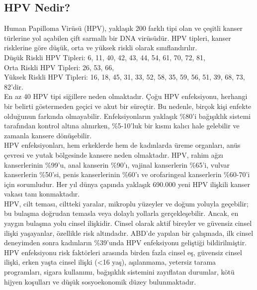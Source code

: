 \documentclass[turkish]{article}
\begin{document}
\subsection{HPV Nedir?}
Human Papilloma Virüsü (HPV), yaklaşık 200 farklı tipi olan ve çeşitli kanser türlerine yol açabilen çift sarmallı bir DNA virüsüdür. HPV tipleri, kanser risklerine göre düşük, orta ve yüksek riskli olarak sınıflandırılır.
\\Düşük Riskli HPV Tipleri: 6, 11, 40, 42, 43, 44, 54, 61, 70, 72, 81,
\\Orta Riskli HPV Tipleri: 26, 53, 66,
\\Yüksek Riskli HPV Tipleri: 16, 18, 45, 31, 33, 52, 58, 35, 59, 56, 51, 39, 68, 73, 82’dir.
\\En az 40 HPV tipi siğillere neden olmaktadır. Çoğu HPV enfeksiyonu, herhangi bir belirti göstermeden geçici ve akut bir süreçtir. Bu nedenle, birçok kişi enfekte olduğunun farkında olmayabilir. Enfeksiyonların yaklaşık \%80’i bağışıklık sistemi tarafından kontrol altına alınırken, \%5-10’luk bir kısmı kalıcı hale gelebilir ve zamanla kansere dönüşebilir.
\\HPV enfeksiyonları, hem erkeklerde hem de kadınlarda üreme organları, anüs çevresi ve yutak bölgesinde kansere neden olmaktadır. HPV, rahim ağzı kanserlerinin \%99’u, anal kanserin \%90’ı, vajinal kanserlerin \%65’i, vulvar kanserlerin \%50’si, penis kanserlerinin \%60’ı ve orofaringeal kanserlerin \%60-70’i için sorumludur. Her yıl dünya çapında yaklaşık 690.000 yeni HPV ilişkili kanser vakası tanı konmaktadır.
\\HPV, cilt teması, ciltteki yaralar, mikroplu yüzeyler ve doğum yoluyla geçebilir; bu bulaşma doğrudan temasla veya dolaylı yollarla gerçekleşebilir. Ancak, en yaygın bulaşma yolu cinsel ilişkidir. Cinsel olarak aktif bireyler ve güvensiz cinsel ilişki yaşayanlar, özellikle risk altındadır. ABD’de yapılan bir çalışmada, ilk cinsel deneyimden sonra kadınların \%39’unda HPV enfeksiyonu geliştiği bildirilmiştir.
\\HPV enfeksiyonu risk faktörleri arasında birden fazla cinsel eş, güvensiz cinsel ilişki, erken yaşta cinsel ilişki (<16 yaş), aşılanmama, yetersiz tarama programları, sigara kullanımı, bağışıklık sistemini zayıflatan durumlar, kötü hijyen koşulları ve düşük sosyoekonomik düzey bulunmaktadır.
\end{document}
